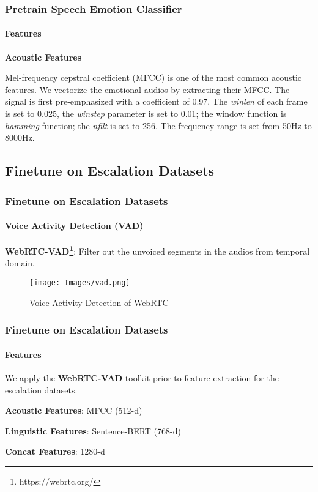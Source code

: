 \documentclass[
	11pt, %
]{beamer}
\begin{document}

\begin{frame}
    \frametitle{Pretrain Speech Emotion Classifier}
    \framesubtitle{Features}
    \textbf{Acoustic Features}
    
    Mel-frequency cepstral coefficient (MFCC) is one of the most common acoustic features. We vectorize the emotional audios by extracting their MFCC. The signal is first pre-emphasized with a coefficient of 0.97. The \emph{winlen} of each frame is set to 0.025, the \emph{winstep} parameter is set to 0.01; the window function is \emph{hamming} function; the \emph{nfilt} is set to 256. The frequency range is set from 50Hz to 8000Hz.


\end{frame}


\subsection{Finetune on Escalation Datasets}

\begin{frame}
    \frametitle{Finetune on Escalation Datasets}
    \framesubtitle{Voice Activity Detection (VAD)}
    \textbf{WebRTC-VAD\footnote{https://webrtc.org/}}: Filter out the unvoiced segments in the audios from temporal domain.
    \begin{figure}
        \centering
        \texttt{[image: Images/vad.png]}
        \caption{Voice Activity Detection of WebRTC}
        \label{fig:my_label}
    \end{figure}


\end{frame}


\begin{frame}
    \frametitle{Finetune on Escalation Datasets}
    \framesubtitle{Features}
    We apply the \textbf{WebRTC-VAD} toolkit prior to feature extraction for the escalation datasets.
    
    \textbf{Acoustic Features}: MFCC (512-d)
    
    \textbf{Linguistic Features}: Sentence-BERT (768-d)
    
    \textbf{Concat Features}: 1280-d


\end{frame}
\end{document}
